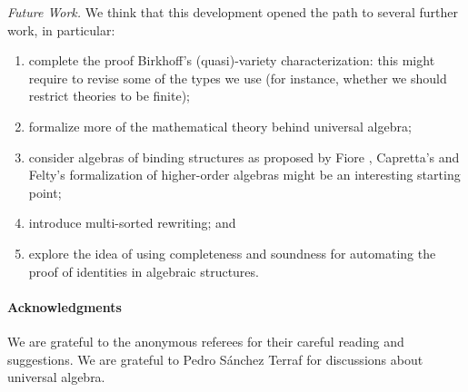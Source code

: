 \textit{Future Work.} We think that this development opened the path
to several further work, in particular:
\begin{enumerate}
\item complete the proof Birkhoff's (quasi)-variety characterization:
  this might require to revise some of the types we use (for instance,
  whether we should restrict theories to be finite);
\item formalize more of the mathematical theory behind universal algebra;
\item consider algebras of binding structures as proposed by Fiore
  \cite{fiore-2010}, Capretta's and Felty's \citeyearpar{capretta/felty:2009}
  formalization of higher-order algebras might be an interesting
  starting point;
\item introduce multi-sorted rewriting; and
\item explore the idea of using completeness and soundness for
  automating the proof of identities in algebraic structures. %
\end{enumerate}


\paragraph*{Acknowledgments}
  We are grateful to the anonymous referees for their careful reading
  and suggestions. We are grateful to Pedro Sánchez Terraf for discussions
  about universal algebra.

